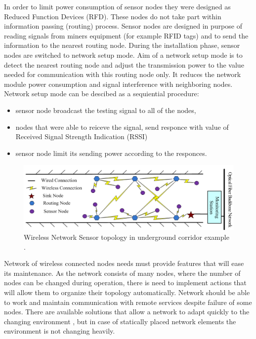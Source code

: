 \documentclass[../main.tex]{subfiles}
\begin{document}
In order to limit power consumption of sensor nodes they were designed as Reduced Function Devices (RFD). These nodes do not take part within information passing (routing) process. Sensor nodes are designed in purpose of reading signals from miners equipment (for example RFID tags) and to send the information to the nearest routing node. During the installation phase, sensor nodes are switched to network setup mode.  Aim of a network setup mode is to detect the nearest routing node and adjust the transmission power to the value needed for communication with this routing node only. It reduces the network module power consumption and signal interference with neighboring nodes. Network setup mode can be descibed as a sequiential procedure:
\begin{itemize}
	\item sensor node broadcast the testing signal to all of the nodes,
	\item nodes that were able to reiceve the signal, send responce with value of Received Signal Strength Indication (RSSI)
	\item sensor node limit its sending power according to the responces.
\end{itemize}

\begin{figure}[!htbp]
\includegraphics[width=\textwidth]{pictures/wsn_topology.png}
\centering
\caption{Wireless Network Sensor topology in underground corridor example \cite{WSN_monitoring}. }
\label{fig:wsn_topology}
\end{figure}

Network of wireless connected nodes needs must provide features that will ease its maintenance. As the network consists of many nodes, where the number of nodes can be changed during operation, there is need to implement actions that will allow them to organize their topology automatically. Network should be able to work and maintain communication with remote services despite failure of some nodes. There are available solutions that allow a network to adapt quickly to the changing environment \cite{WSN_collective}, but in case of statically placed network elements the environment is not changing heavily.
\end{document}
